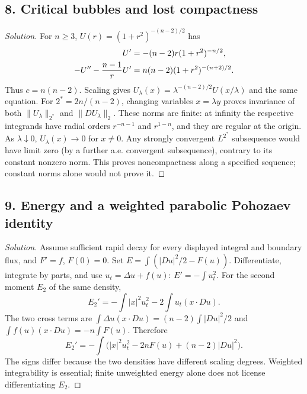 \subsection*{8. Critical bubbles and lost compactness}
\begin{proof}[Solution]
For $n\geq3$, $U(r)=(1+r^2)^{-(n-2)/2}$ has
\[
 \begin{split}
 U'&=-(n-2)r(1+r^2)^{-n/2},\\
 -U''-{n-1\over r}U'&=n(n-2)(1+r^2)^{-(n+2)/2}.
 \end{split}
\]
Thus $c=n(n-2)$. Scaling gives
$U_\lambda(x)=\lambda^{-(n-2)/2}U(x/\lambda)$ and the same equation.
For $2^*=2n/(n-2)$, changing variables $x=\lambda y$ proves invariance
of both $\|U_\lambda\|_{2^*}$ and $\|DU_\lambda\|_2$.
These norms are finite: at infinity the respective integrands have radial
orders $r^{-n-1}$ and $r^{1-n}$, and they are regular at the origin.
As $\lambda\downarrow0$, $U_\lambda(x)\to0$ for $x\ne0$.
Any strongly convergent $L^{2^*}$ subsequence would have limit zero
(by a further a.e. convergent subsequence), contrary to its constant
nonzero norm. This proves noncompactness along a specified sequence;
constant norms alone would not prove it.
\end{proof}
\Needspace{42mm}

\subsection*{9. Energy and a weighted parabolic Pohozaev identity}
\begin{proof}[Solution]
Assume sufficient rapid decay for every displayed integral and boundary
flux, and $F'=f$, $F(0)=0$. Set $E=\int(|Du|^2/2-F(u))$.
Differentiate, integrate by parts, and use $u_t=\Delta u+f(u)$:
$E'=-\int u_t^2$. For the second moment $E_2$ of the same density,
\[
 E_2'=-\int |x|^2u_t^2-2\int u_t(x\cdot Du).
\]
The two cross terms are
$\int\Delta u(x\cdot Du)=(n-2)\int|Du|^2/2$ and
$\int f(u)(x\cdot Du)=-n\int F(u)$. Therefore
\[
 E_2'=-\int\bigl(|x|^2u_t^2-2nF(u)+(n-2)|Du|^2\bigr).
\]
The signs differ because the two densities have different scaling degrees.
Weighted integrability is essential; finite unweighted energy alone does
not license differentiating $E_2$.
\end{proof}

